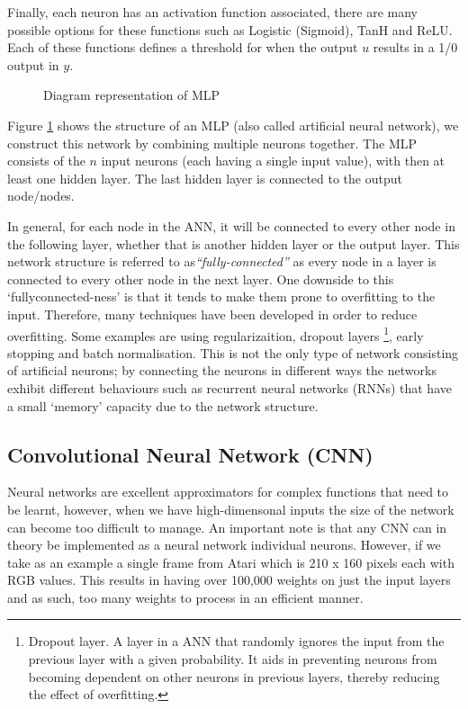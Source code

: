 Finally, each neuron has an activation function associated, there are many possible options for these functions such as Logistic (Sigmoid), TanH and ReLU. Each of these functions defines a threshold for when the output $u$ results in a 1/0 output in $y$.

\begin{figure}[ht!]
	\centering
	\caption{Diagram representation of MLP} \label{fig:mlp}
\end{figure}

Figure \ref{fig:mlp} shows the structure of an MLP (also called artificial neural network), we construct this network by combining multiple neurons together. The MLP consists of the $n$ input neurons (each having a single input value), with then at least one hidden layer. The last hidden layer is connected to the output node/nodes.

In general, for each node in the ANN, it will be connected to every other node in the following layer, whether that is another hidden layer or the output layer. This network structure is referred to as\textit{``fully-connected''} as every node in a layer is connected to every other node in the next layer. One downside to this `fullyconnected-ness' is that it tends to make them prone to overfitting to the input. Therefore, many techniques have been developed in order to reduce overfitting. Some examples are using regularizaition, dropout layers \footnote{Dropout layer. A layer in a ANN that randomly ignores the input from the previous layer with a given probability. It aids in preventing neurons from becoming dependent on other neurons in previous layers, thereby reducing the effect of overfitting.}, early stopping and batch normalisation. This is not the only type of network consisting of artificial neurons; by connecting the neurons in different ways the networks exhibit different behaviours such as recurrent neural networks (RNNs) that have a small `memory' capacity due to the network structure.

\subsection{Convolutional Neural Network (CNN)}
\label{dsgn:sec:dl:cnn}
Neural networks are excellent approximators for complex functions that need to be learnt, however, when we have high-dimensonal inputs the size of the network can become too difficult to manage. An important note is that any CNN can in theory be implemented as a neural network individual neurons. However, if we take as an example a single frame from Atari which is 210 x 160 pixels each with RGB values. This results in having over 100,000 weights on just the input layers and as such, too many weights to process in an efficient manner.

